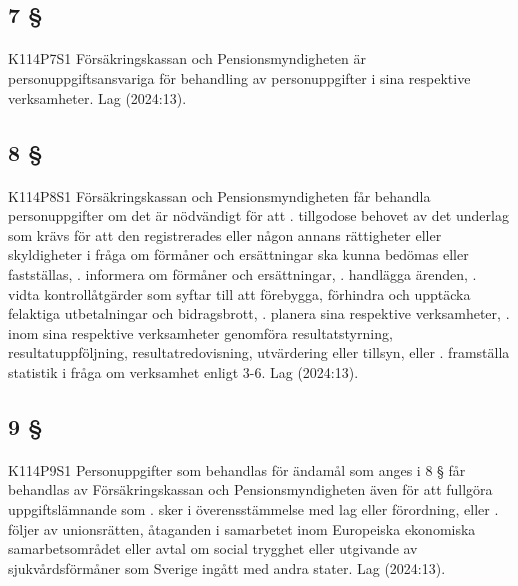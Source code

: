 \documentclass[a4paper,notitlepage,openany,10pt]{book}
\begin{document}
\subsection*{7 §}
\paragraph*{}
{\tiny K114P7S1}
Försäkringskassan och Pensionsmyndigheten är personuppgiftsansvariga för behandling av personuppgifter i sina respektive verksamheter.
Lag (2024:13).
\subsection*{8 §}
\paragraph*{}
{\tiny K114P8S1}
Försäkringskassan och Pensionsmyndigheten får behandla personuppgifter om det är nödvändigt för att
. tillgodose behovet av det underlag som krävs för att den registrerades eller någon annans rättigheter eller skyldigheter i fråga om förmåner och ersättningar ska kunna bedömas eller fastställas,
. informera om förmåner och ersättningar,
. handlägga ärenden,
. vidta kontrollåtgärder som syftar till att förebygga, förhindra och upptäcka felaktiga utbetalningar och bidragsbrott,
. planera sina respektive verksamheter,
. inom sina respektive verksamheter genomföra resultatstyrning, resultatuppföljning, resultatredovisning, utvärdering eller tillsyn, eller
. framställa statistik i fråga om verksamhet enligt 3-6.
Lag (2024:13).
\subsection*{9 §}
\paragraph*{}
{\tiny K114P9S1}
Personuppgifter som behandlas för ändamål som anges i 8 § får behandlas av Försäkringskassan och Pensionsmyndigheten även för att fullgöra uppgiftslämnande som
. sker i överensstämmelse med lag eller förordning, eller
. följer av unionsrätten, åtaganden i samarbetet inom Europeiska ekonomiska samarbetsområdet eller avtal om social trygghet eller utgivande av sjukvårdsförmåner som Sverige ingått med andra stater.
Lag (2024:13).
\end{document}

